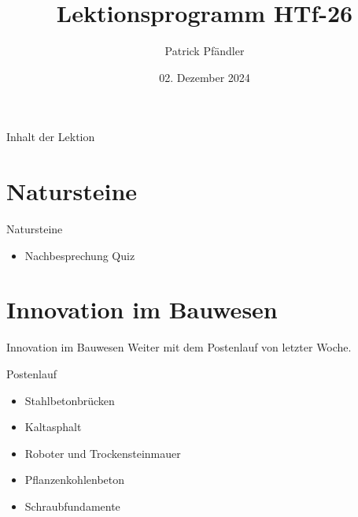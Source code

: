     

    \title{\textbf{Lektionsprogramm HTf-26}}
    \author{Patrick Pfändler}
    \date{02. Dezember 2024}


    

    \frame{\titlepage}

    \begin{frame}{Inhalt der Lektion}
        \tableofcontents
    \end{frame}


    \section{Natursteine}
    \begin{frame}{Natursteine}
        \begin{itemize}
            \item [\textbullet] Nachbesprechung Quiz
        \end{itemize}
    \end{frame}


    \section{Innovation im Bauwesen}

    \begin{frame}{Innovation im Bauwesen}
        Weiter mit dem Postenlauf von letzter Woche.
        \begin{block}{Postenlauf}
            \begin{itemize}
                \item [\textbullet] Stahlbetonbrücken
                \item [\textbullet] Kaltasphalt
                \item [\textbullet] Roboter und Trockensteinmauer
                \item [\textbullet] Pflanzenkohlenbeton
                \item [\textbullet] Schraubfundamente
            \end{itemize}
        \end{block}
    \end{frame}


